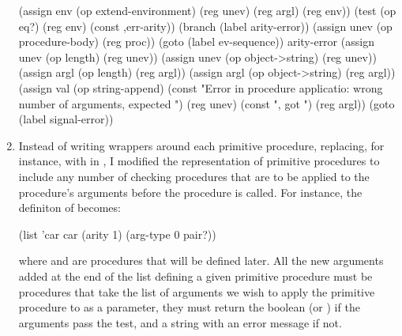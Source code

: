\begin{exe}[5.30]
\begin{enumerate}
\begin{cscm}
		    (assign env (op extend-environment) (reg unev) (reg argl) (reg env))
		    (test (op eq?) (reg env) (const ,err-arity))
		    (branch (label arity-error))
		    (assign unev (op procedure-body) (reg proc))
		    (goto (label ev-sequence))
		arity-error
		    (assign unev (op length) (reg unev))
		    (assign unev (op object->string) (reg unev))
		    (assign argl (op length) (reg argl))
		    (assign argl (op object->string) (reg argl))
		    (assign val (op string-append)
			    (const "Error in procedure applicatio: wrong number of arguments, expected ")
			    (reg unev) (const ", got ") (reg argl))
		    (goto (label signal-error))
	    \end{cscm}

	\item Instead of writing wrappers around each primitive procedure, 
	    replacing, for instance,  with
	     in , 
	    I modified the representation of primitive procedures to include any 
	    number of checking procedures that are to be applied to the 
	    procedure’s arguments before the procedure is called. For instance, 
	    the definiton of  becomes:
	    \begin{cscm}
		(list 'car car (arity 1) (arg-type 0 pair?))
	    \end{cscm}
	    where  and  are procedures 
	    that will be defined later. All the new arguments added at the end 
	    of the list defining a given primitive procedure must be procedures 
	    that take the list of arguments we wish to apply the primitive 
	    procedure to as a parameter, they must return the boolean 
	     (or ) if the arguments pass the test, and 
	    a string with an error message if not.


\end{enumerate}
\end{exe}
